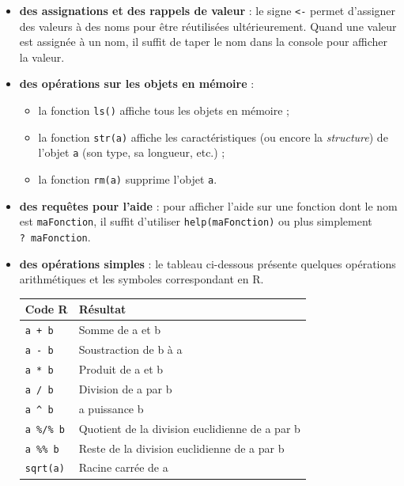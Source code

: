 \documentclass[12pt,twosided, notitlepage]{book}
\providecommand{\tightlist}{%
  \setlength{\itemsep}{0pt}\setlength{\parskip}{0pt}}
\begin{document}
\begin{itemize}
\item
  \textbf{des assignations et des rappels de valeur} : le signe
  \texttt{\textless{}-} permet d'assigner des valeurs à des noms pour
  être réutilisées ultérieurement. Quand une valeur est assignée à un
  nom, il suffit de taper le nom dans la console pour afficher la
  valeur.
\item
  \textbf{des opérations sur les objets en mémoire} :

  \begin{itemize}
  \tightlist
  \item
    la fonction \texttt{ls()} affiche tous les
    objets en mémoire ;
  \item
    la fonction \texttt{str(a)} affiche les
    caractéristiques (ou encore la \emph{structure}) de l'objet
    \texttt{a} (son type, sa longueur, etc.) ;
  \item
    la fonction \texttt{rm(a)} supprime
    l'objet \texttt{a}.
  \end{itemize}
\item
  \textbf{des requêtes pour l'aide} : pour afficher l'aide sur une
  fonction dont le nom est \texttt{maFonction}, il suffit d'utiliser
  \texttt{help(maFonction)} ou plus
  simplement \texttt{?\ maFonction}.
\item
  \textbf{des opérations simples} : le tableau ci-dessous présente
  quelques opérations arithmétiques et les symboles correspondant en R.

  \begin{longtable}[]{@{}ll@{}}
  \toprule
  Code R & Résultat\tabularnewline
  \midrule
  \endhead
  \texttt{a\ +\ b}\index{\texttt{+}|textbf} & Somme de a et
  b\tabularnewline
  \texttt{a\ -\ b}\index{\texttt{-}|textbf} & Soustraction de b à
  a\tabularnewline
  \texttt{a\ *\ b}\index{\texttt{*}|textbf} & Produit de a et
  b\tabularnewline
  \texttt{a\ /\ b}\index{\texttt{/}|textbf} & Division de a par
  b\tabularnewline
  \texttt{a\ \^{}\ b}\index{\texttt{\textasciicircum}|textbf} & a
  puissance b\tabularnewline
  \texttt{a\ \%/\%\ b}\index{\texttt{\%/\%}|textbf} & Quotient de la
  division euclidienne de a par b\tabularnewline
  \texttt{a\ \%\%\ b}\index{\texttt{\%\%}|textbf} & Reste de la division
  euclidienne de a par b\tabularnewline
  \texttt{sqrt(a)}\index{\texttt{sqrt}|textbf} & Racine carrée de
  a\tabularnewline
  \bottomrule
  \end{longtable}
\end{itemize}
\end{document}
